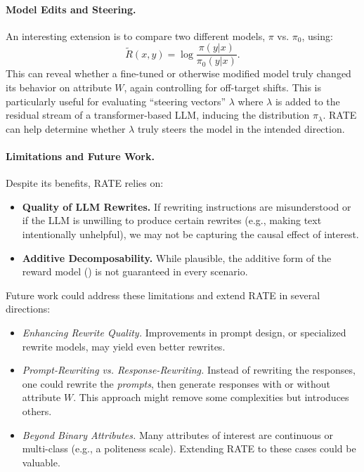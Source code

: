 \paragraph{Model Edits and Steering.}
An interesting extension is to compare two different models, $\pi$ vs. $\pi_0$, using:
\[
\tilde{R}(x,y) = \log\frac{\pi(y|x)}{\pi_0(y|x)}.
\]
This can reveal whether a fine-tuned or otherwise modified model truly changed its behavior on attribute $W$, again controlling for off-target shifts. This is particularly useful for evaluating ``steering vectors'' $\lambda$ where $\lambda$ is added to the residual stream of a transformer-based LLM, inducing the distribution $\pi_\lambda$. RATE can help determine whether $\lambda$ truly steers the model in the intended direction.

\paragraph{Limitations and Future Work.}
Despite its benefits, RATE relies on:
\begin{itemize}
    \item \textbf{Quality of LLM Rewrites.} If rewriting instructions are misunderstood or if the LLM is unwilling to produce certain rewrites (e.g., making text intentionally unhelpful), we may not be capturing the causal effect of interest.
    \item \textbf{Additive Decomposability.} While plausible, the additive form of the reward model () is not guaranteed in every scenario.
\end{itemize}

Future work could address these limitations and extend RATE in several directions:
\begin{itemize}
    \item \emph{Enhancing Rewrite Quality.} Improvements in prompt design, or specialized rewrite models, may yield even better rewrites.
    \item \emph{Prompt-Rewriting vs. Response-Rewriting.} Instead of rewriting the responses, one could rewrite the \emph{prompts}, then generate responses with or without attribute $W$. This approach might remove some complexities but introduces others.
    \item \emph{Beyond Binary Attributes.} Many attributes of interest are continuous or multi-class (e.g., a politeness scale). Extending RATE to these cases could be valuable.
\end{itemize}

